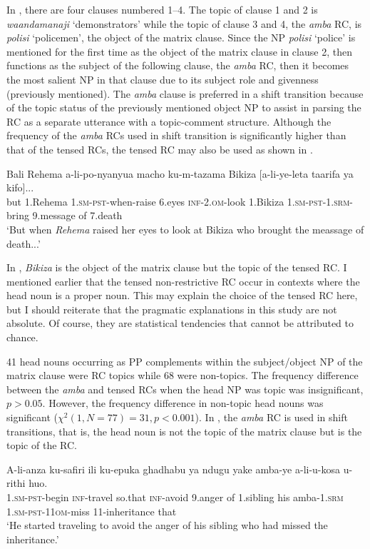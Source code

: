 \documentclass[output=paper,colorlinks,citecolor=brown]{langscibook}
\begin{document}
In , there are four clauses numbered 1--4. The topic of clause 1 and 2 is \textit{waandamanaji} ‘demonstrators’ while the topic of clause 3 and 4, the \textit{amba} RC, is \textit{polisi} ‘policemen’, the object of the matrix clause. Since the NP \textit{polisi} ‘police’ is mentioned for the first time as the object of the matrix clause in clause 2, then functions as the subject of the following clause, the \textit{amba} RC, then it becomes the most salient NP in that clause due to its subject role and givenness (previously mentioned). The \textit{amba} clause is preferred in a shift transition because of the topic status of the previously mentioned object NP to assist in parsing the RC as a separate utterance with a topic-comment structure. Although the frequency of the \textit{amba} RCs used in shift transition is significantly higher than that of the tensed RCs, the tensed RC may also be used as shown in .

\ea%
    \label{ex:mwamzandi:29}
    \gll    Bali Rehema a-li-po-nyanyua macho ku-m-tazama Bikiza [a-li-ye-leta taarifa ya kifo]...\\
            but 1.Rehema \textsc{1.sm-pst-}when-raise 6.eyes \textsc{inf-2.om-}look 1.Bikiza  \textsc{1.sm-pst-1.srm-}bring 9.message of 7.death\\
    \glt    ‘But when \textit{Rehema} raised her eyes to look at Bikiza who brought the meassage of death...’
\z

In , \textit{Bikiza} is the object of the matrix clause but the topic of the tensed RC. I mentioned earlier that the tensed non-restrictive RC occur in contexts where the head noun is a proper noun. This may explain the choice of the tensed RC here, but I should reiterate that the pragmatic explanations in this study are not absolute. Of course, they are statistical tendencies that cannot be attributed to chance.

41 head nouns occurring as PP complements within the subject/object NP of the matrix clause were RC topics while 68 were non-topics. The frequency difference between the \textit{amba} and tensed RCs when the head NP was topic was insignificant, $p>0.05$. However, the frequency difference in non-topic head nouns was significant ($\chi^2 (1,N=77)=31, p<0.001$). In , the \textit{amba} RC is used in shift transitions, that is, the head noun is not the topic of the matrix clause but is the topic of the RC.

\ea%
    \label{ex:mwamzandi:30}
    \gll    A-li-anza ku-safiri ili ku-epuka ghadhabu ya ndugu yake amba-ye a-li-u-kosa u-rithi huo.\\
            \textsc{1.sm-pst-}begin \textsc{inf-}travel so.that \textsc{inf}-avoid 9.anger of 1.sibling his amba\textsc{-1.srm} \textsc{1.sm-pst-11om}-miss 11-inheritance that\\
    \glt    ‘He started traveling to avoid the anger of his sibling who had missed the inheritance.’
\z
\end{document}
